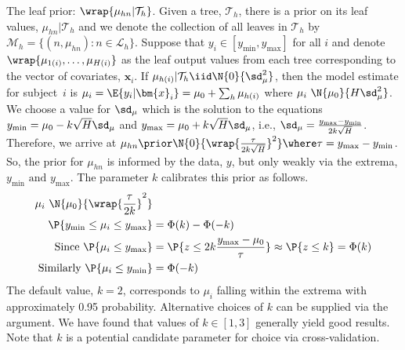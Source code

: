 \documentclass[article]{jss}
\begin{document}
The leaf prior: $\wrap{\mu_{hn}|\mathcal{T}_h}$.  Given a tree, $\mathcal{T}_h$, there is
a prior on its leaf values, $\mu_{hn}|\mathcal{T}_h$ and we denote the
collection of all leaves in $\mathcal{T}_h$ by
$\mathcal{M}_h=\{(n, \mu_{hn}): n \in \mathcal{L}_h \}$.
Suppose that $y_i \in [y_{\min}, y_{\max}]$ for all $i$ and denote 
$\wrap{\mu_{1(i)}, \dots, \mu_{H(i)}}$ as the leaf output values from each 
tree corresponding to the vector of covariates, $\bm{x}_i$.
If $\mu_{h(i)}|\mathcal{T}_h \iid \N{0}{\sd_{\mu}^2}$, then the model 
estimate for subject~$i$ is 
$\mu_i=\E{y_i|\bm{x}_i}=\mu_0+\sum_h\mu_{h(i)}$ where
$\mu_i ~ \N{\mu_0}{H \sd_{\mu}^2}$.  We
choose a value for $\sd_{\mu}$ which is the solution to the equations
$y_{\min}=\mu_0-k\sqrt{H}\sd_{\mu}$
and $y_{\max}=\mu_0+k\sqrt{H}\sd_{\mu}$, i.e.,
$\sd_{\mu}=\frac{y_{\max}-y_{\min}}{2 k \sqrt{H}}$.
Therefore, we arrive at
$\mu_{hn} \prior \N{0}{\wrap{\frac{\tau}{2k\sqrt{H}}}^2} \where
\tau={y_{\max}-y_{\min}}$.  So, the prior for $\mu_{hn}$ is informed
by the data, $y$, but only weakly via the extrema,
$y_{\min}\mbox{\ and\ }y_{\max}$.  The parameter $k$ calibrates this
prior as follows.
\begin{align*}
\mu_i ~\N{\mu_0}{\wrap{\frac{\tau}{2 k}}^2}& \\
\P{y_{\min} \le \mu_i \le y_{\max}} &  = \Phi(k) - \Phi(-k)\\
\mbox{Since\ }\P{\mu_i \le y_{\max}} &= \P{z \le 2k \frac{y_{\max}-\mu_0}{\tau}} \approx
 \P{z \le k} = \Phi(k) \\
\mbox{Similarly\ }\P{\mu_i \le y_{\min}} &= \Phi(-k)
\end{align*}
The default value, $k=2$, corresponds to
$\mu_i$ falling within the extrema with approximately 0.95
probability.  Alternative choices of
$k$ can be supplied via the  argument.  We have found that
values of $k \in [1, 3]$ generally yield good results.  Note that
$k$ is a potential candidate parameter for choice via
cross-validation.
\end{document}
